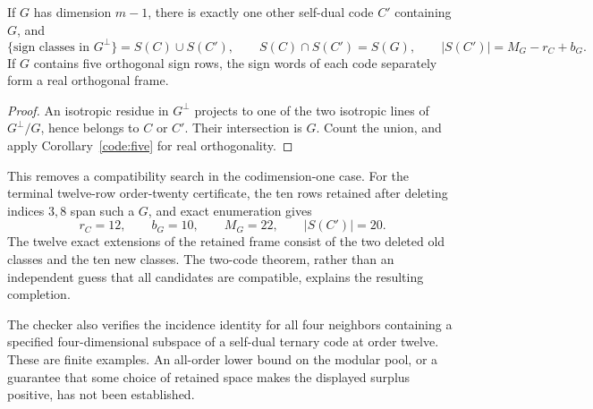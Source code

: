 \begin{corollary}
\label{code:two-codes}
If $G$ has dimension $m-1$, there is exactly one other self-dual
code $C'$ containing $G$, and
\[
 \{ \text{sign classes in }G^\perp\}=S(C)\cup S(C'),\qquad
 S(C)\cap S(C')=S(G),\qquad
 |S(C')|=M_G-r_C+b_G.
\]
If $G$ contains five orthogonal sign rows, the sign words of each
code separately form a real orthogonal frame.
\end{corollary}
\begin{proof}
An isotropic residue in $G^\perp$ projects to one of the two
isotropic lines of $G^\perp/G$, hence belongs to $C$ or $C'$.
Their intersection is $G$. Count the union, and apply
Corollary~\ref{code:five} for real orthogonality.
\end{proof}

This removes a compatibility search in the codimension-one case.
For the terminal twelve-row order-twenty certificate, the ten rows
retained after deleting indices $3,8$ span such a $G$, and exact
enumeration gives
\[
 r_C=12,\qquad b_G=10,\qquad M_G=22,\qquad |S(C')|=20.
\]
The twelve exact extensions of the retained frame consist of the two
deleted old classes and the ten new classes. The two-code theorem,
rather than an independent guess that all candidates are compatible,
explains the resulting completion.

The checker also verifies the incidence identity for all four
neighbors containing a specified four-dimensional subspace of a
self-dual ternary code at order twelve. These are finite examples.
An all-order lower bound on the modular pool, or a guarantee that
some choice of retained space makes the displayed surplus positive,
has not been established.
